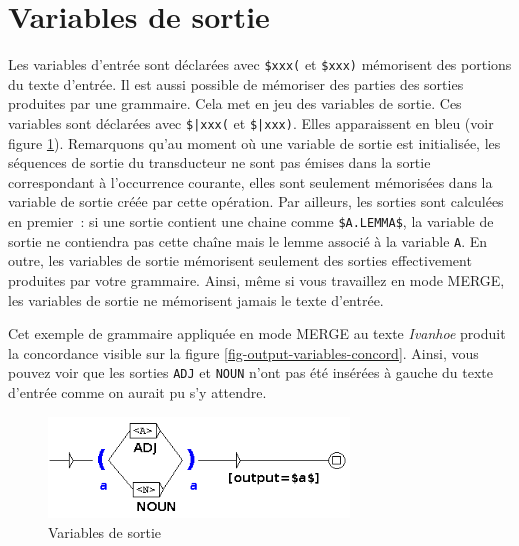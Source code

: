 

\newpage

\section{Variables de sortie}
\label{section-output-variables}
Les variables d'entrée sont déclarées avec \verb+$xxx(+ et \verb+$xxx)+ mémorisent des portions du
texte d'entrée. 
Il est aussi possible de mémoriser des parties des sorties produites par une grammaire.
Cela met en jeu des variables de sortie.
Ces variables sont déclarées avec \verb+$|xxx(+ et \verb+$|xxx)+.
Elles apparaissent en bleu (voir figure \ref{fig-output-variables}).
Remarquons qu'au moment où une variable de sortie est initialisée,
les séquences de sortie du transducteur ne sont pas émises dans la sortie correspondant à l'occurrence courante,
elles sont seulement mémorisées dans la variable de sortie créée par cette opération.
Par ailleurs, les sorties sont calculées en premier~: si une sortie contient une chaine comme 
\verb+$A.LEMMA$+, la variable de sortie ne contiendra pas cette chaîne mais le lemme associé à
la variable \verb+A+. En outre, les variables de sortie mémorisent seulement des sorties
effectivement produites par votre grammaire. Ainsi, même si vous travaillez en mode MERGE, les
variables de sortie ne mémorisent jamais le texte d'entrée.

\noindent Cet exemple de grammaire appliquée en mode MERGE au texte \textit{Ivanhoe} produit la
concordance visible sur la figure \ref{fig-output-variables-concord}. 
Ainsi, vous pouvez voir que les sorties \verb+ADJ+ et \verb+NOUN+ n'ont pas été insérées à gauche du texte d'entrée comme on aurait pu s'y attendre.

\begin{figure}[!ht]
\begin{center}
\includegraphics[width=8cm]{resources/img/fig6-17r.png}
\caption{Variables de sortie\label{fig-output-variables}}
\end{center}
\end{figure}

